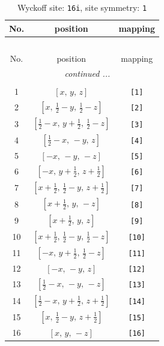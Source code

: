 \documentclass[fleqn,8pt]{jsarticle}
\begin{document}
\begin{longtable}{ccc}
\caption{Wyckoff site: {\tt 16i}, site symmetry: {\tt 1}}
 \\
 \hline \hline
No. & position & mapping \\ \hline \endfirsthead

\multicolumn{2}{l}{\tablename\ \thetable{}} \\
 \hline \hline
No. & position & mapping \\ \hline \endhead

 \hline \hline
\multicolumn{2}{r}{\footnotesize\it continued ...} \\ \endfoot

 \hline \hline
\multicolumn{2}{r}{} \\ \endlastfoot

1 & $\left[ x,\, y,\, z \right]$ & {\tt [1]} \\ \hline
2 & $\left[ x,\, \frac{1}{2} - y,\, \frac{1}{2} - z \right]$ & {\tt [2]} \\ \hline
3 & $\left[ \frac{1}{2} - x,\, y + \frac{1}{2},\, \frac{1}{2} - z \right]$ & {\tt [3]} \\ \hline
4 & $\left[ \frac{1}{2} - x,\, - y,\, z \right]$ & {\tt [4]} \\ \hline
5 & $\left[ - x,\, - y,\, - z \right]$ & {\tt [5]} \\ \hline
6 & $\left[ - x,\, y + \frac{1}{2},\, z + \frac{1}{2} \right]$ & {\tt [6]} \\ \hline
7 & $\left[ x + \frac{1}{2},\, \frac{1}{2} - y,\, z + \frac{1}{2} \right]$ & {\tt [7]} \\ \hline
8 & $\left[ x + \frac{1}{2},\, y,\, - z \right]$ & {\tt [8]} \\ \hline
9 & $\left[ x + \frac{1}{2},\, y,\, z \right]$ & {\tt [9]} \\ \hline
10 & $\left[ x + \frac{1}{2},\, \frac{1}{2} - y,\, \frac{1}{2} - z \right]$ & {\tt [10]} \\ \hline
11 & $\left[ - x,\, y + \frac{1}{2},\, \frac{1}{2} - z \right]$ & {\tt [11]} \\ \hline
12 & $\left[ - x,\, - y,\, z \right]$ & {\tt [12]} \\ \hline
13 & $\left[ \frac{1}{2} - x,\, - y,\, - z \right]$ & {\tt [13]} \\ \hline
14 & $\left[ \frac{1}{2} - x,\, y + \frac{1}{2},\, z + \frac{1}{2} \right]$ & {\tt [14]} \\ \hline
15 & $\left[ x,\, \frac{1}{2} - y,\, z + \frac{1}{2} \right]$ & {\tt [15]} \\ \hline
16 & $\left[ x,\, y,\, - z \right]$ & {\tt [16]} \\
\end{longtable}
\end{document}
